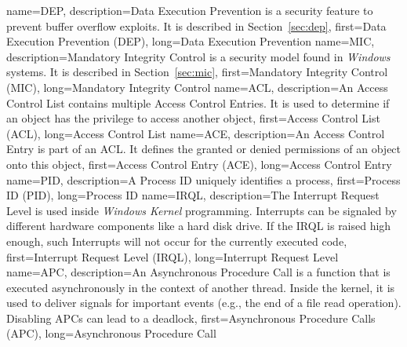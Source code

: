 {
  name={DEP},
  description={Data Execution Prevention is a security feature to prevent buffer overflow exploits. It is described in Section~\ref{sec:dep}},
  first={Data Execution Prevention (DEP)},
  long={Data Execution Prevention}
}
{
  name={MIC},
  description={Mandatory Integrity Control is a security model found in \emph{Windows} systems. It is described in Section~\ref{sec:mic}},
  first={Mandatory Integrity Control (MIC)},
  long={Mandatory Integrity Control}
}
{
  name={ACL},
  description={An Access Control List contains multiple Access Control Entries. It is used to determine if an object has the privilege to access another object},
  first={Access Control List (ACL)},
  long={Access Control List}
}
{
  name={ACE},
  description={An Access Control Entry is part of an ACL. It defines the granted or denied permissions of an object onto this object},
  first={Access Control Entry (ACE)},
  long={Access Control Entry}
}
{
  name={PID},
  description={A Process ID uniquely identifies a process},
  first={Process ID (PID)},
  long={Process ID}
}
{
  name={IRQL},
  description={The Interrupt Request Level is used inside \emph{Windows Kernel} programming. Interrupts can be signaled by different hardware components like a hard disk drive. If the IRQL is raised high enough, such Interrupts will not occur for the currently executed code},
  first={Interrupt Request Level (IRQL)},
  long={Interrupt Request Level}
}
{
  name={APC},
  description={An Asynchronous Procedure Call is a function that is executed asynchronously in the context of another thread. Inside the kernel, it is used to deliver signals for important events (e.g., the end of a file read operation). Disabling APCs can lead to a deadlock},
  first={Asynchronous Procedure Calls (APC)},
  long={Asynchronous Procedure Call}
}